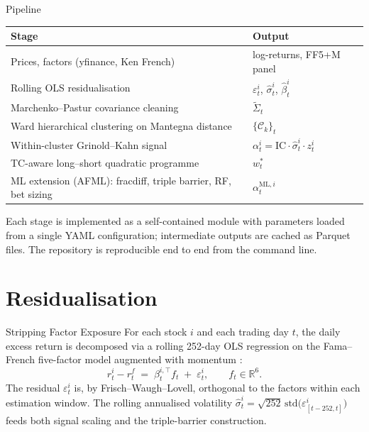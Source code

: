 \documentclass[10pt,aspectratio=169]{beamer}
\begin{document}
\begin{frame}{Pipeline}
  \small
  \begin{center}
  \begin{tabular}{l@{\hskip 8pt}l}
  \toprule
  \textbf{Stage} & \textbf{Output} \\
  \midrule
  Prices, factors (yfinance, Ken French) & log-returns, FF5+M panel \\
  Rolling OLS residualisation & $\varepsilon_t^i$, $\hat{\sigma}_t^i$, $\hat{\beta}_t^i$ \\
  Marchenko--Pastur covariance cleaning & $\tilde{\Sigma}_t$ \\
  Ward hierarchical clustering on Mantegna distance & $\{\mathcal{C}_k\}_t$ \\
  Within-cluster Grinold--Kahn signal & $\alpha_t^i = \mathrm{IC}\cdot \hat{\sigma}_t^i \cdot z_t^i$ \\
  TC-aware long--short quadratic programme & $w_t^*$ \\
  \midrule
  ML extension (AFML): fracdiff, triple barrier, RF, bet sizing & $\alpha_t^{\mathrm{ML},i}$ \\
  \bottomrule
  \end{tabular}
  \end{center}

  \medskip

  Each stage is implemented as a self-contained module with parameters loaded from a single YAML configuration; intermediate outputs are cached as Parquet files. The repository is reproducible end to end from the command line.
\end{frame}

\section{Residualisation}

\begin{frame}{Stripping Factor Exposure}
  \small
  For each stock $i$ and each trading day $t$, the daily excess return is decomposed via a rolling 252-day OLS regression on the Fama--French five-factor model augmented with momentum \cite{fama2015}:
  \[
    r_t^i - r_t^f \;=\; \beta_t^{i,\top} f_t \;+\; \varepsilon_t^i, \qquad f_t \in \mathbb{R}^6.
  \]
  The residual $\varepsilon_t^i$ is, by Frisch--Waugh--Lovell, orthogonal to the factors within each estimation window. The rolling annualised volatility
  \(
    \hat{\sigma}_t^i = \sqrt{252}\,\mathrm{std}\bigl(\varepsilon_{[t-252, t]}^i\bigr)
  \)
  feeds both signal scaling and the triple-barrier construction.
\end{frame}
\end{document}
